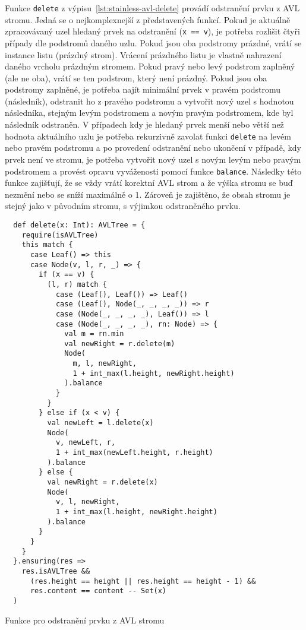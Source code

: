 Funkce \texttt{delete} z výpisu~\ref{lst:stainless-avl-delete}
provádí odstranění prvku z AVL stromu.
Jedná se o nejkomplexnejší z představených funkcí.
Pokud je aktuálně zpracovávaný uzel hledaný prvek na odstranění (\texttt{x == v}),
je potřeba rozlišit čtyři případy dle podstromů daného uzlu.
Pokud jsou oba podstromy prázdné, vrátí se instance listu (prázdný strom).
Vrácení prázdného listu je vlastně nahrazení daného vrcholu prázdným stromem.
Pokud pravý nebo levý podstrom zaplněný (ale ne oba),
vrátí se ten podstrom, který není prázdný.
Pokud jsou oba podstromy zaplněné,
je potřeba najít minimální prvek v pravém podstromu (následník),
odstranit ho z pravého podstromu
a vytvořit nový uzel s hodnotou následníka, stejným levým podstromem
a novým pravým podstromem, kde byl následník odstraněn.
V případech kdy je hledaný prvek menší nebo větší než hodnota aktuálního uzlu
je potřeba rekurzivně zavolat funkci \texttt{delete} na levém nebo pravém podstromu
a po provedení odstranění nebo ukončení v případě, kdy prvek není ve stromu,
je potřeba vytvořit nový uzel s novým levým nebo pravým podstromem
a provést opravu vyváženosti pomocí funkce \texttt{balance}.
Následky této funkce zajišťují, že se vždy vrátí korektní AVL strom
a že výška stromu se buď nezmění nebo se sníží maximálně o 1.
Zároveň je zajištěno, že obsah stromu je stejný jako v původním stromu,
s výjimkou odstraněného prvku.

\begin{listing}[H]
  \begin{verbatim}
  def delete(x: Int): AVLTree = {
    require(isAVLTree)
    this match {
      case Leaf() => this
      case Node(v, l, r, _) => {
        if (x == v) {
          (l, r) match {
            case (Leaf(), Leaf()) => Leaf()
            case (Leaf(), Node(_, _, _, _)) => r
            case (Node(_, _, _, _), Leaf()) => l
            case (Node(_, _, _, _), rn: Node) => {
              val m = rn.min
              val newRight = r.delete(m)
              Node(
                m, l, newRight,
                1 + int_max(l.height, newRight.height)
              ).balance
            }
          }
        } else if (x < v) {
          val newLeft = l.delete(x)
          Node(
            v, newLeft, r,
            1 + int_max(newLeft.height, r.height)
          ).balance
        } else {
          val newRight = r.delete(x)
          Node(
            v, l, newRight,
            1 + int_max(l.height, newRight.height)
          ).balance
        }
      }
    }
  }.ensuring(res =>
    res.isAVLTree &&
      (res.height == height || res.height == height - 1) &&
      res.content == content -- Set(x)
  )
  \end{verbatim}
  \caption{Funkce pro odstranění prvku z AVL stromu}
  \label{lst:stainless-avl-delete}
\end{listing}

